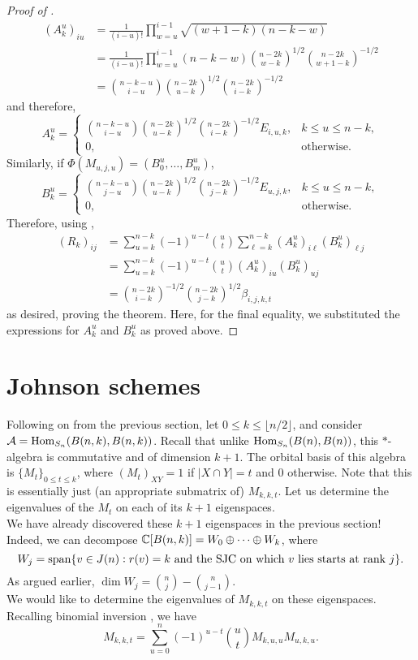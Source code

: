 \begin{proof}[Proof of ]
\begin{align*}
			(A_k^u)_{iu} &= \frac{1}{(i-u)!} \prod_{w=u}^{i-1} \sqrt{(w+1-k)(n-k-w)} \\
				&= \frac{1}{(i-u)!} \prod_{w=u}^{i-1} (n-k-w) \binom{n-2k}{w-k}^{1/2} \binom{n-2k}{w+1-k}^{-1/2} \\
				&= \binom{n-k-u}{i-u} \binom{n-2k}{u-k}^{1/2} \binom{n-2k}{i-k}^{-1/2}
		\end{align*}
		and therefore,
		\[ A_k^u = \begin{cases} \binom{n-k-u}{i-u} \binom{n-2k}{u-k}^{1/2} \binom{n-2k}{i-k}^{-1/2} E_{i,u,k}, & k \le u \le n-k, \\ 0, & \text{otherwise.} \end{cases} \]
		Similarly, if $\Phi(M_{u,j,u}) = (B_0^u,\ldots,B_m^u)$,
		\[ B_k^u = \begin{cases} \binom{n-k-u}{j-u} \binom{n-2k}{u-k}^{1/2} \binom{n-2k}{j-k}^{-1/2} E_{u,j,k}, & k \le u \le n-k, \\ 0, & \text{otherwise.} \end{cases} \]
		Therefore, using ,
		\begin{align*}
			(R_k)_{ij} &= \sum_{u=k}^{n-k} (-1)^{u-t} \binom{u}{t} \sum_{\ell=k}^{n-k} (A_k^u)_{i\ell} (B_k^u)_{\ell j} \\
				&= \sum_{u=k}^{n-k} (-1)^{u-t} \binom{u}{t} (A_k^u)_{iu} (B_k^u)_{uj} \\
				&= \binom{n-2k}{i-k}^{-1/2} \binom{n-2k}{j-k}^{1/2} \beta_{i,j,k,t}
		\end{align*}
		as desired, proving the theorem. Here, for the final equality, we substituted the expressions for $A_k^u$ and $B_k^u$ as proved above.
	\end{proof}

\clearpage
\section{Johnson schemes}
\label{subsec:johnson-schemes}

	Following on from the previous section, let $0 \le k \le \lfloor n/2\rfloor$, and consider $\mathcal{A} = \operatorname{Hom}_{S_n}(B(n,k),B(n,k))$. Recall that unlike $\operatorname{Hom}_{S_n}(B(n),B(n))$, this $*$-algebra is commutative and of dimension $k+1$. The orbital basis of this algebra is $\{M_t\}_{0 \le t \le k}$, where $(M_t)_{XY} = 1$ if $|X \cap Y| = t$ and $0$ otherwise. Note that this is essentially just (an appropriate submatrix of) $M_{k,k,t}$. Let us determine the eigenvalues of the $M_t$ on each of its $k+1$ eigenspaces.\\
	We have already discovered these $k+1$ eigenspaces in the previous section! Indeed, we can decompose $\mathbb{C}[B(n,k)] = W_0 \oplus \cdots \oplus W_k$, where
	\[ W_j = \operatorname{span}\{v \in J(n) : r(v)=k \text{ and the SJC on which $v$ lies starts at rank $j$} \}. \]
	As argued earlier, $\dim W_j = \binom{n}{j} - \binom{n}{j-1}$.\\
	We would like to determine the eigenvalues of $M_{k,k,t}$ on these eigenspaces.
	Recalling binomial inversion , we have
	\[ M_{k,k,t} = \sum_{u=0}^{n} (-1)^{u-t} \binom{u}{t} M_{k,u,u} M_{u,k,u}. \]

